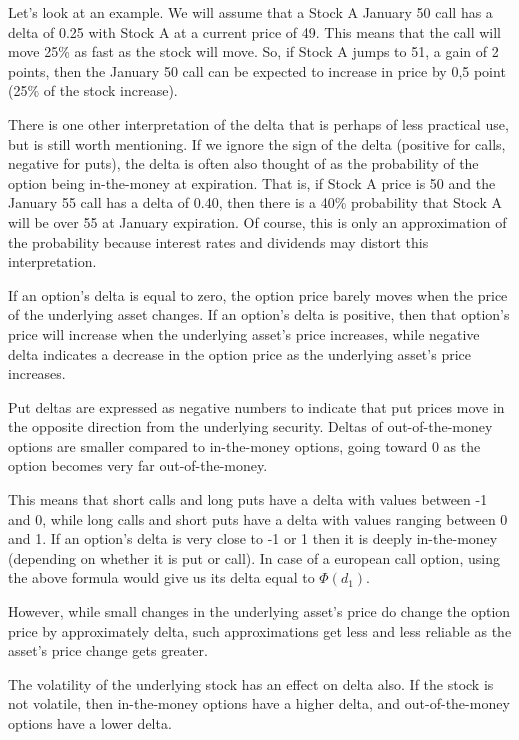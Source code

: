\documentclass[a4paper, 12pt]{article}
\theoremstyle{definition}
\theoremstyle{plain}
\begin{document}
Let's look at an example. We will assume that a Stock A January 50 call has a delta of 0.25 
with Stock A at a current price of 49. This means that the call will move 
25\% as fast as the stock will move. So, if Stock A
jumps to 51, a gain of 2 points, then the January 50 call can be expected to increase
in price by 0,5 point (25\% of the stock increase).

There is one other interpretation of the delta that is perhaps of less practical
use, but is still worth mentioning.
If we ignore the sign of the delta (positive for
calls, negative for puts),
the delta is often also thought of as the probability of the
option being in-the-money at expiration. 
That is, if Stock A price is 50 and the January 55 call has
a delta of 0.40, then there is a 40\% probability that Stock A will be over 55 at January
expiration. 
Of course, this is only an approximation of the probability because
interest rates and dividends may distort this interpretation.

If an option's 
delta is equal to zero, the 
option price barely moves when the price of the 
underlying asset changes. 
If an option's delta is positive, then 
that option's price will increase 
when the underlying asset's price 
increases, while negative delta indicates a decrease
in the option price as the underlying 
asset's price increases. 

Put deltas are expressed as negative numbers to indicate that put prices move
in the opposite direction from the underlying security. 
Deltas of out-of-the-money options are smaller 
compared to in-the-money options, going toward 0 as the option becomes
very far out-of-the-money. 

This means that short calls and long puts have 
a delta with values between -1 and 0, while 
long calls and short puts have a delta
with values ranging between 0 and 1.
If an option's delta is very close to -1 or 1 
then it is deeply in-the-money
(depending on whether it is put or call).
In case of a european call option, 
using the above formula would give us 
its delta equal to $\Phi(d_1)$. 

However, while small changes in the underlying asset's
price do change the option price by approximately delta,
such approximations get less and less reliable as 
the asset's price change gets greater.

The volatility of the underlying stock has an effect on delta also. If the stock is not
volatile, then in-the-money options have a higher delta, and out-of-the-money
options have a lower delta.
\end{document}
